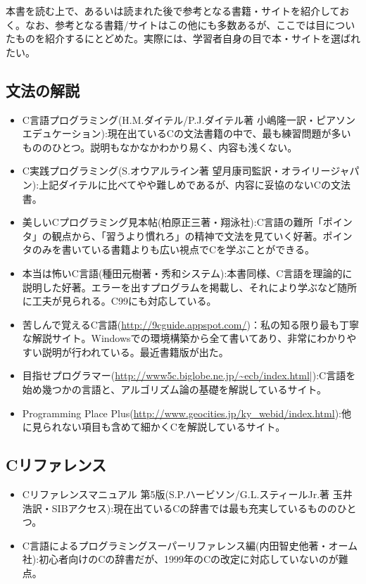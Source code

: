 本書を読む上で、あるいは読まれた後で参考となる書籍・サイトを紹介しておく。なお、参考となる書籍/サイトはこの他にも多数あるが、ここでは目についたものを紹介するにとどめた。実際には、学習者自身の目で本・サイトを選ばれたい。

\subsection*{文法の解説}
\begin{itemize}
 \item C言語プログラミング(H.M.ダイテル/P.J.ダイテル著 小嶋隆一訳・ピアソンエデュケーション):現在出ているCの文法書籍の中で、最も練習問題が多いもののひとつ。説明もなかなかわかり易く、内容も浅くない。
 \item C実践プログラミング(S.オウアルライン著  望月康司監訳・オライリージャパン):上記ダイテルに比べてやや難しめであるが、内容に妥協のないCの文法書。
 \item 美しいCプログラミング見本帖(柏原正三著・翔泳社):C言語の難所「ポインタ」の観点から、「習うより慣れろ」の精神で文法を見ていく好著。ポインタのみを書いている書籍よりも広い視点でCを学ぶことができる。
 \item 本当は怖いC言語(種田元樹著・秀和システム):本書同様、C言語を理論的に説明した好著。エラーを出すプログラムを掲載し、それにより学ぶなど随所に工夫が見られる。C99にも対応している。
 \item 苦しんで覚えるC言語(\url{http://9cguide.appspot.com/})：私の知る限り最も丁寧な解説サイト。Windowsでの環境構築から全て書いてあり、非常にわかりやすい説明が行われている。最近書籍版が出た。
 \item 目指せプログラマー(\url{http://www5c.biglobe.ne.jp/~ecb/index.html}|):C言語を始め幾つかの言語と、アルゴリズム論の基礎を解説しているサイト。
 \item Programming Place Plus(\url{http://www.geocities.jp/ky_webid/index.html}):他に見られない項目も含めて細かくCを解説しているサイト。
\end{itemize}

\subsection*{Cリファレンス}
\begin{itemize}
 \item Cリファレンスマニュアル 第5版(S.P.ハービソン/G.L.スティールJr.著 玉井浩訳・SIBアクセス):現在出ているCの辞書では最も充実しているもののひとつ。
 \item C言語によるプログラミングスーパーリファレンス編(内田智史他著・オーム社):初心者向けのCの辞書だが、1999年のCの改定に対応していないのが難点。
\end{itemize}

